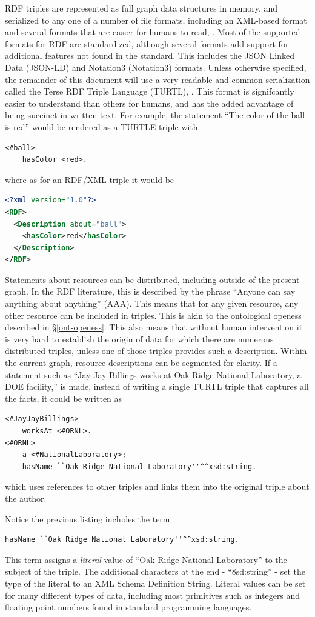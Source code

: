 RDF triples are represented as full graph data structures in memory, and
serialized to any one of a number of file formats, including an XML-based format
and several formats that are easier for humans to read, \cite{rdf-wikipedia}.
Most of the supported formats for RDF are standardized, although several formats
add support for additional features not found in the standard. This includes the
JSON Linked Data (JSON-LD) and Notation3 (Notation3) formats. Unless otherwise
specified, the remainder of this document will use a very readable and common
serialization called the Terse RDF Triple Language (TURTL), \cite{turtl}. This
format is signifcantly easier to understand than others for humans, and has the added
advantage of being succinct in written text. For example, the statement ``The
color of the ball is red'' would be rendered as a TURTLE triple with
\begin{lstlisting}[language=TURTL]
<#ball>
    hasColor <red>.
\end{lstlisting}
where as for an RDF/XML triple it would be
\begin{lstlisting}[language=XML]
<?xml version="1.0"?>
<RDF>
  <Description about="ball">
    <hasColor>red</hasColor>
  </Description>
</RDF>
\end{lstlisting}

Statements about resources can be distributed, including outside of the
present graph. In the RDF literature, this is described by the
phrase ``Anyone can say anything about anything'' (AAA). This means that for any
given resource, any other resource can be included in triples. This is akin to
the ontological openess described in \S \ref{ont-openess}. This also means that
without human intervention it is very hard to establish the origin of data
for which there are numerous distributed triples, unless one of those
triples provides such a description. Within the current graph, resource
descriptions can be segmented for clarity. If a statement such as ``Jay Jay
Billings works at Oak Ridge National Laboratory, a DOE facility,'' is made,
instead of writing a single TURTL triple that captures all the facts, it
could be written as
\begin{lstlisting}[language=TURTL]
<#JayJayBillings>
    worksAt <#ORNL>.
<#ORNL>
    a <#NationalLaboratory>;
    hasName ``Oak Ridge National Laboratory''^^xsd:string.    
\end{lstlisting}
which uses references to other triples and links them into the original
triple about the author.

Notice the previous listing includes the term
\begin{lstlisting}[language=TURTL]
    hasName ``Oak Ridge National Laboratory''^^xsd:string.
\end{lstlisting}
This term assigns a \textit{literal} value of ``Oak Ridge National Laboratory''
to the subject of the triple. The additional characters at the end -
``^^xsd:string'' - set the type of the literal to an XML Schema Definition
String. Literal values can be set for many different types of data, including
most primitives such as integers and floating point numbers found in standard
programming languages.

